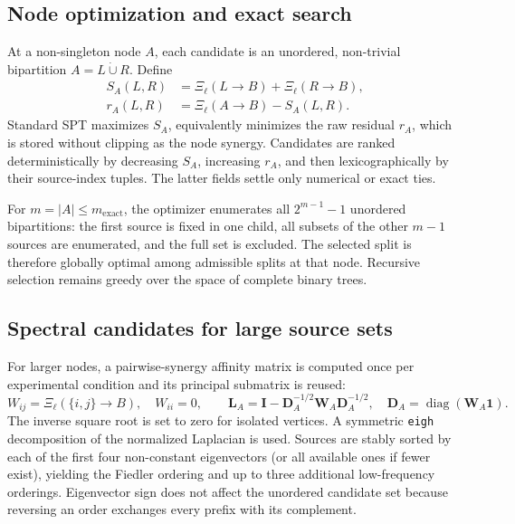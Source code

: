 \subsection{Node optimization and exact search}

At a non-singleton node \(A\), each candidate is an unordered, non-trivial bipartition \(A=L\mathbin{\dot{\cup}}R\). Define 
\begin{align} S_A(L,R)&=\Xi_{\ell}(L\rightarrow B)+\Xi_{\ell}(R\rightarrow B),\\ r_A(L,R)&=\Xi_{\ell}(A\rightarrow B)-S_A(L,R). 
\label{eq:supp_spt_score} 
\end{align} 
Standard SPT maximizes \(S_A\), equivalently minimizes the raw residual \(r_A\), which is stored without clipping as the node synergy. Candidates are ranked deterministically by decreasing \(S_A\), increasing \(r_A\), and then lexicographically by their source-index tuples. The latter fields settle only numerical or exact ties.

For \(m=|A|\leq m_{\mathrm{exact}}\), the optimizer enumerates all \(2^{m-1}-1\) unordered bipartitions: the first source is fixed in one child, all subsets of the other \(m-1\) sources are enumerated, and the full set is excluded. The selected split is therefore globally optimal among admissible splits at that node. Recursive selection remains greedy over the space of complete binary trees.\par 


\subsection{Spectral candidates for large source sets}
For larger nodes, a pairwise-synergy affinity matrix is computed once per experimental condition and its principal submatrix is reused: 
\begin{equation} W_{ij}=\Xi_{\ell}(\{i,j\}\rightarrow B),\quad W_{ii}=0,\qquad \mathbf{L}_A=\mathbf{I}-\mathbf{D}_A^{-1/2} \mathbf{W}_A\mathbf{D}_A^{-1/2},\quad \mathbf{D}_A=\operatorname{diag}(\mathbf{W}_A\mathbf{1}). 
\label{eq:supp_spt_spectral} 
\end{equation} 
The inverse square root is set to zero for isolated vertices. A symmetric \texttt{eigh} decomposition of the normalized Laplacian is used. Sources are stably sorted by each of the first four non-constant eigenvectors (or all available ones if fewer exist), yielding the Fiedler ordering and up to three additional low-frequency orderings. Eigenvector sign does not affect the unordered candidate set because reversing an order exchanges every prefix with its complement.

